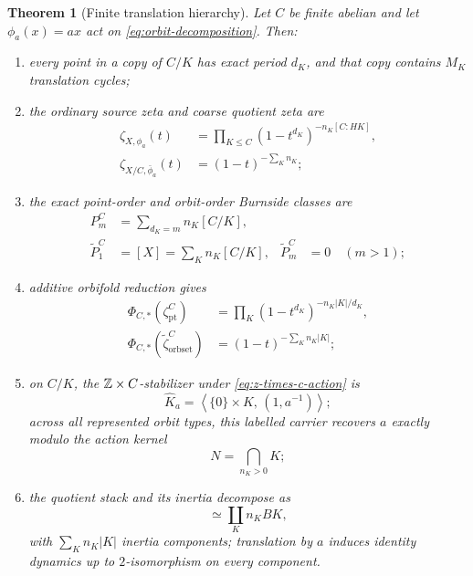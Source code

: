 \documentclass[11pt]{article}
\newtheorem{theorem}{Theorem}[section]
\theoremstyle{definition}
\theoremstyle{remark}
\begin{document}
\begin{theorem}[Finite translation hierarchy]
\label{thm:finite-hierarchy}
Let \(C\) be finite abelian and let
\(\phi_a(x)=ax\) act on \eqref{eq:orbit-decomposition}.  Then:
\begin{enumerate}
  \item every point in a copy of \(C/K\) has exact period \(d_K\), and that
        copy contains \(M_K\) translation cycles;
  \item the ordinary source zeta and coarse quotient zeta are
        \begin{align}
          \zeta_{X,\phi_a}(t)
          &=\prod_{K\le C}(1-t^{d_K})^{-n_K[C:HK]},
          \label{eq:general-source-zeta}\\
          \zeta_{X/C,\bar\phi_a}(t)
          &=(1-t)^{-\sum_K n_K};
          \label{eq:general-coarse-zeta}
        \end{align}
  \item the exact point-order and orbit-order Burnside classes are
        \begin{align}
          P_m^C&=\sum_{d_K=m}n_K[C/K],
          \label{eq:general-point-class}\\
          \widetilde P_1^C&=[X]=\sum_Kn_K[C/K],
          &
          \widetilde P_m^C&=0\quad(m>1);
          \label{eq:general-orbit-class}
        \end{align}
  \item additive orbifold reduction gives
        \begin{align}
          \Phi_{C,*}(\zeta_{\mathrm{pt}}^C)
          &=\prod_K(1-t^{d_K})^{-n_K|K|/d_K},
          \label{eq:general-point-orbifold}\\
          \Phi_{C,*}(\widetilde\zeta_{\mathrm{orbset}}^C)
          &=(1-t)^{-\sum_Kn_K|K|};
          \label{eq:general-orbit-orbifold}
        \end{align}
  \item on \(C/K\), the \(\mathbb{Z}\times C\)-stabilizer under
        \eqref{eq:z-times-c-action} is
        \begin{equation}
          \widehat K_a
          =\left\langle\{0\}\times K,\,(1,a^{-1})\right\rangle;
          \label{eq:general-twisted-stabilizer}
        \end{equation}
        across all represented orbit types, this labelled carrier recovers
        \(a\) exactly modulo the action kernel
        \begin{equation}
          N=\bigcap_{n_K>0}K;
          \label{eq:action-kernel}
        \end{equation}
  \item the quotient stack and its inertia decompose as
        \begin{equation}
          [X/C]\simeq\coprod_K n_K BK,
          \label{eq:stack-decomposition}
        \end{equation}
        with \(\sum_Kn_K|K|\) inertia components; translation by \(a\)
        induces identity dynamics up to \(2\)-isomorphism on every component.
\end{enumerate}
\end{theorem}
\end{document}
